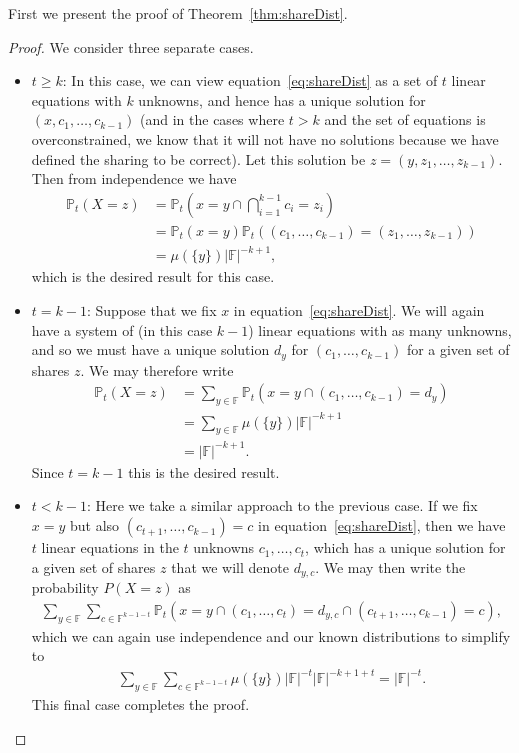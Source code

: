 \documentclass{article}
\theoremstyle{remark}
\newcommand{\F}{\mathbb{F}}
\renewcommand{\P}{\mathbb{P}}
\begin{document}
First we present the proof of Theorem~\ref{thm:shareDist}.
\begin{proof}
	We consider three separate cases.
	\begin{itemize}
		\item $t \ge k$: In this case, we can view
			equation~\eqref{eq:shareDist} as a set of $t$ linear equations with
			$k$ unknowns, and hence has a unique solution for $(x, c_1, \ldots,
			c_{k-1})$ (and in the cases where $t > k$ and the set of equations
			is overconstrained, we know that it will not have no solutions
			because we have defined the sharing to be correct). Let this
			solution be $z = (y, z_1, \ldots, z_{k-1})$. Then from independence
			we have
			\begin{align*}
				\P_t(X = z) &=
				\P_t\left(
					x = y \cap \bigcap_{i = 1}^{k-1} c_i = z_i
				\right)\\
				&= \P_t(x = y)
				\P_t((c_1, \ldots, c_{k-1}) = (z_1, \ldots, z_{k-1}))\\
				&= \mu(\{y\})|\F|^{-k+1},
			\end{align*}
			which is the desired result for this case.

		\item $t = k - 1$: Suppose that we fix $x$ in
			equation~\eqref{eq:shareDist}. We will again have a system of (in
			this case $k-1$) linear equations with as many unknowns, and so we
			must have a unique solution $d_y$ for $(c_1, \ldots, c_{k-1})$ for
			a given set of shares $z$. We may therefore write
			\begin{align*}
				\P_t(X = z) &=
				\sum_{y \in \F}
				\P_t(x = y \cap (c_1, \ldots, c_{k-1}) = d_y)\\
				&= \sum_{y \in \F} \mu(\{y\})|\F|^{-k+1}\\
				&= |\F|^{-k+1}.
			\end{align*}
			Since $t = k - 1$ this is the desired result.

		\item $t < k - 1$: Here we take a similar approach to the previous
			case. If we fix $x = y$ but also $(c_{t+1}, \ldots, c_{k-1}) = c$
			in equation~\eqref{eq:shareDist}, then we have $t$ linear equations
			in the $t$ unknowns $c_1, \ldots, c_t$, which has a unique solution
			for a given set of shares $z$ that we will denote $d_{y, c}$. We
			may then write the probability $P(X = z)$ as
			\begin{align*}
				\sum_{y \in \F}\sum_{c \in \F^{k - 1 - t}}
				\P_t(
					x = y \cap
					(c_1, \ldots, c_t) = d_{y, c} \cap
					(c_{t+1}, \ldots, c_{k-1}) = c
				),
			\end{align*}
			which we can again use independence and our known distributions to
			simplify to
			\begin{align*}
				\sum_{y \in \F}\sum_{c \in \F^{k - 1 - t}}
				\mu(\{y\})|\F|^{-t}|\F|^{-k+1+t}
				=
				|\F|^{-t}.
			\end{align*}
			This final case completes the proof.
	\end{itemize}
\end{proof}
\end{document}
